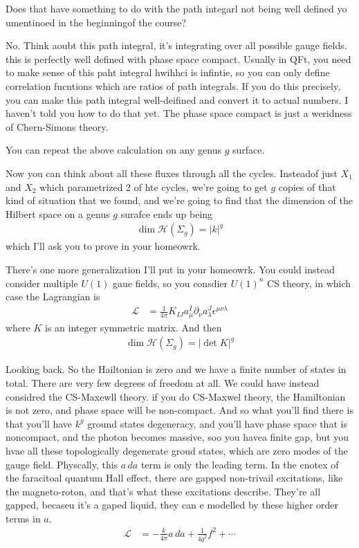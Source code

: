 \begin{question}
    Does that have something to do with the path integarl not being well defined
    yo umentinoed in the beginningof the course?
\end{question}
No.
Think aoubt this path integral,
it's integrating over all possible gauge fields.
this is perfectly well defined with phase space compact.
Usually in QFt,
you need to make sense of this paht integral hwihhci is infintie,
so you can only define correlation fucntions which are ratios of path integrals.
If you do this precisely,
you can make this path integral well-deifined and convert it to actual numbers.
I haven't told you how to do that yet.
The phase space compact is just a weridness of Chern-Simons theory.

You can repeat the above calculation on any genus $g$ surface.

Now you can think about all these fluxes through all the cycles.
Insteadof just $X_1$ and $X_2$ which parametrized 2 of hte cycles,
we're going to get $g$ copies of that kind of situation that we found,
and we're going to find that the dimension of the Hilbert space on a genus $g$
surafce ends up being
\begin{align}
    \dim \mathcal{H}\left( \Sigma_g \right) = 
    |k|^g
\end{align}
which I'll ask you to prove in your homeowrk.

There's one more generalization I'll put in your homeowrk.
You could instead consider multiple $U(1)$ gaue fields,
so you consdier $U(1)^n$ CS theory,
in which case the Lagrangian is
\begin{align}
    \mathcal{L}
    &=
    \frac{1}{4\pi} K_{IJ}
    a_\mu^{I} \partial_\nu a_\lambda^J \epsilon^{\mu\nu\lambda}
\end{align}
where $K$ is an integer symmetric matrix.
And then
\begin{align}
    \dim\mathcal{H}\left( \Sigma_g \right) = 
    |\det K|^g
\end{align}

Looking back.
So the Hailtonian is zero and we have a finite number of states in total.
There are very few degrees of freedom at all.
We could have instead considred the CS-Maxewll theory.
if you do CS-Maxwel theory,
the Hamiltonian is not zero,
and phase space will be non-compact.
And so what you'll find there is that you'll have $k^g$
ground states degeneracy,
and you'll have phase space that is noncompact,
and the photon becomes massive,
soo you havea finite gap,
but you hvae all these topologically degenerate groud states,
which are zero modes of the gauge field.
Physcally, this $a\, da$ term is only the leading term.
In the cnotex of the faracitoal quantum Hall effect,
there are gapped non-trivail excitations,
like the magneto-roton,
and that's what these excitations describe.
They're all gapped,
becaseu it's a gaped liquid,
they can e modelled by these higher order terms in $a$.
\begin{align}
    \mathcal{L} &=
    -\frac{k}{4\pi} a\, da
    +
    \frac{1}{4g^2} f^2
    + \cdots
\end{align}

